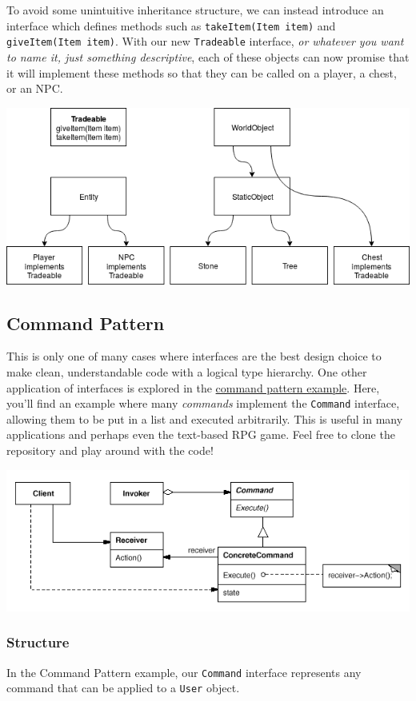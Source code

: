 \documentclass{article}
\begin{document}
    		To avoid some unintuitive inheritance structure, we can instead introduce an interface which defines methods such as \verb|takeItem(Item item)| and \verb|giveItem(Item item)|. With our new \verb|Tradeable| interface, \textit{or whatever you want to name it, just something descriptive}, each of these objects can now promise that it will implement these methods so that they can be called on a player, a chest, or an NPC.

    		\includegraphics[width=\textwidth]{images/interfaces/classesWithInterface.png}

    	\subsection{Command Pattern}
    		This is only one of many cases where interfaces are the best design choice to make clean, understandable code with a logical type hierarchy. One other application of interfaces is explored in the \href{https://github.com/andrewlalis/CommandPatternTutorial}{command pattern example}. Here, you'll find an example where many \textit{commands} implement the \verb|Command| interface, allowing them to be put in a list and executed arbitrarily. This is useful in many applications and perhaps even the text-based RPG game. Feel free to clone the repository and play around with the code!

    		\includegraphics[width=\textwidth]{images/interfaces/commandPattern.png}

	    	\subsubsection{Structure}
	    		In the Command Pattern example, our \verb|Command| interface represents any command that can be applied to a \verb|User| object.
\end{document}
